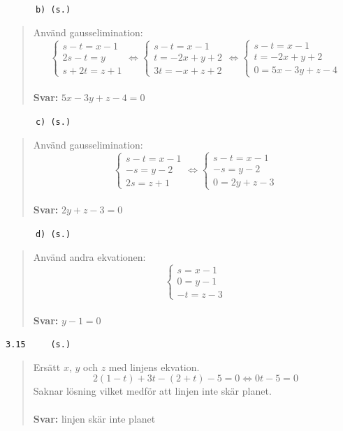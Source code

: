 \documentclass[a4paper]{article}
\newcommand{\tskcol}[1]{\textcolor{tskcol}{#1}}
\begin{document}
\pagebreak
\texttt{\tskcol{~~~~~~b) (s.)}}
\begin{quotation}
	\noindent
	Använd gausselimination:
	\[\begin{cases}
	s-t=x-1 \\
	2s-t=y \\
	s+2t=z+1
	\end{cases} \Leftrightarrow
	\begin{cases}
	s-t=x-1 \\
	t=-2x+y+2 \\
	3t=-x+z+2
	\end{cases} \Leftrightarrow
	\begin{cases}
	s-t=x-1 \\
	t=-2x+y+2 \\
	0=5x-3y+z-4
	\end{cases}\]
	\\
	\textbf{Svar:} $5x-3y+z-4=0$
\end{quotation}

\texttt{\tskcol{~~~~~~c) (s.)}}
\begin{quotation}
	\noindent
	Använd gausselimination:
	\[\begin{cases}
	s-t=x-1 \\
	-s=y-2 \\
	2s=z+1
	\end{cases} \Leftrightarrow
	\begin{cases}
	s-t=x-1 \\
	-s=y-2 \\
	0=2y+z-3
	\end{cases}\]
	\\
	\textbf{Svar:} $2y+z-3=0$
\end{quotation}

\texttt{\tskcol{~~~~~~d) (s.)}}
\begin{quotation}
	\noindent
	Använd andra ekvationen:
	\[\begin{cases}
	s=x-1 \\
	0=y-1 \\
	-t=z-3
	\end{cases}\]
	\\
	\textbf{Svar:} $y-1=0$
\end{quotation}

\texttt{\tskcol{3.15~~~~ (s.)}}
\begin{quotation}
	\noindent
	Ersätt $x$, $y$ och $z$ med linjens ekvation.
	\[2(1-t)+3t-(2+t)-5=0 \Leftrightarrow
	0t-5=0\]
	Saknar lösning vilket medför att linjen inte skär planet.
	\\ \\
	\textbf{Svar:} linjen skär inte planet
\end{quotation}
\end{document}

